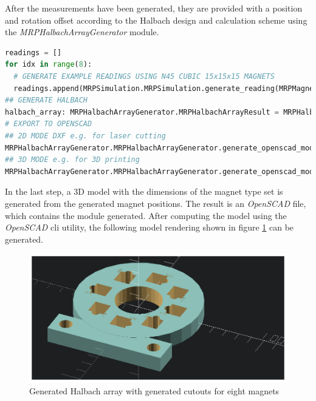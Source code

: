 After the measurements have been generated, they are provided with a
position and rotation offset according to the Halbach design and
calculation scheme  using the
\emph{MRPHalbachArrayGenerator} module.

\begin{lstlisting}[language=Python, caption={MRPHalbachArrayGenerator example for generating an OpenSCAD based Halbach ring}, label=lst:mrpexample_halbach]
readings = []
for idx in range(8):
  # GENERATE EXAMPLE READINGS USING N45 CUBIC 15x15x15 MAGNETS
  readings.append(MRPSimulation.MRPSimulation.generate_reading(MRPMagnetTypes.MagnetType.N45_CUBIC_15x15x15))
## GENERATE HALBACH
halbach_array: MRPHalbachArrayGenerator.MRPHalbachArrayResult = MRPHalbachArrayGenerator.MRPHalbachArrayGenerator.generate_1k_halbach_using_polarisation_direction(readings)
# EXPORT TO OPENSCAD
## 2D MODE DXF e.g. for laser cutting
MRPHalbachArrayGenerator.MRPHalbachArrayGenerator.generate_openscad_model([halbach_array], "./2d_test.scad",_2d_object_code=True)
## 3D MODE e.g. for 3D printing
MRPHalbachArrayGenerator.MRPHalbachArrayGenerator.generate_openscad_model([halbach_array], "./3d_test.scad",_2d_object_code=False)
\end{lstlisting}

In the last step, a 3D model with the dimensions of the magnet type set
is generated from the generated magnet positions. The result is an
\emph{OpenSCAD}  file, which contains the module
generated. After computing the model using the \emph{OpenSCAD} \gls{cli}
utility, the following model rendering shown in figure
\ref{Generated_Halbach_array_with_generated_cutouts_for_eight_magnets.png}
can be generated.

\begin{figure}
\centering
\includegraphics{./generated_images/border_Generated_Halbach_array_with_generated_cutouts_for_eight_magnets.png}
\caption{Generated Halbach array with generated cutouts for eight
magnets
\label{Generated_Halbach_array_with_generated_cutouts_for_eight_magnets.png}}
\end{figure}


